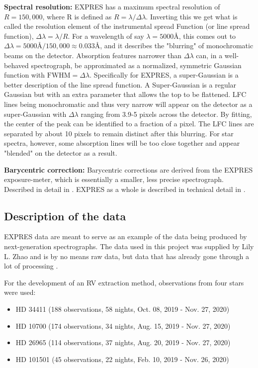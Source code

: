 \bigbreak
\noindent\textbf{Spectral resolution:}
EXPRES has a maximum spectral resolution of $R = 150,000$, where R is defined as $R = \lambda / \Delta\lambda$. Inverting this we get what is called the resolution element of the instrumental spread Function (or line spread function), $\Delta\lambda = \lambda/R$. For a wavelength of say $\lambda = 5000$Å, this comes out to $\Delta\lambda = 5000\text{Å}/150,000 \approx 0.033 $Å, and it describes the "blurring" of monochromatic beams on the detector. Absorption features narrower than $\Delta\lambda$ can, in a well-behaved spectrograph, be approximated as a normalized, symmetric Gaussian function with $\text{FWHM} = \Delta\lambda$. Specifically for EXPRES, a super-Gaussian is a better description of the line spread function\cite{yale_data}. A Super-Gaussian is a regular Gaussian but with an extra parameter that allows the top to be flattened. LFC lines being monochromatic and thus very narrow will appear on the detector as a super-Gaussian with $\Delta\lambda$ ranging from 3.9-5 pixels across the detector. By fitting, the center of the peak can be identified to a fraction of a pixel. The LFC lines are separated by about 10 pixels to remain distinct after this blurring. For star spectra, however, some absorption lines will be too close together and appear "blended" on the detector as a result\cite{yale_data}.

\bigbreak
\noindent\textbf{Barycentric correction:}
Barycentric corrections are derived from the EXPRES exposure-meter, which is essentially a smaller, less precise spectrograph. Described in detail in \cite{barycentric_exposure_meter_blackman}. EXPRES as a whole is described in technical detail in \cite{EXPRES_technical_details_Jurgenson}.


\subsection{Description of the data}
EXPRES data are meant to serve as an example of the data being produced by next-generation spectrographs. The data used in this project was supplied by Lily L. Zhao and is by no means raw data, but data that has already gone through a lot of processing \cite{yale_data}.

For the development of an RV extraction method, observations from four stars were used: 

\begin{itemize}
    \item HD 34411 (188 observations, 58 nights, Oct. 08, 2019 - Nov. 27, 2020)
    \item HD 10700 (174 observations, 34 nights, Aug. 15, 2019 - Nov. 27, 2020)
    \item HD 26965 (114 observations, 37 nights, Aug. 20, 2019 - Nov. 27, 2020)
    \item HD 101501 (45 observations, 22 nights, Feb. 10, 2019 - Nov. 26, 2020)
\end{itemize}

